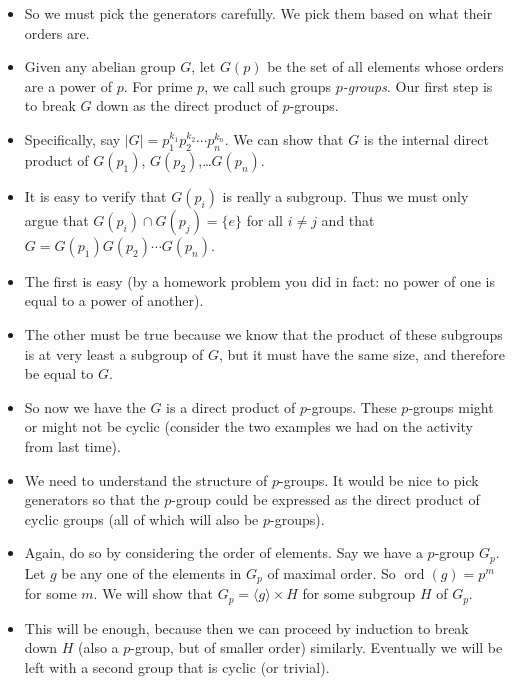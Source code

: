 \documentclass[12pt]{article}
\theoremstyle{plain}
\theoremstyle{definition}
\theoremstyle{remark}
\DeclareMathOperator{\ord}{ord}
\begin{document}
\begin{itemize}
\item So we must pick the generators carefully.  We pick them based on what their orders are.

\item Given any abelian group $G$, let $G(p)$ be the set of all elements whose orders are a power of $p$.  For prime $p$, we call such groups \emph{$p$-groups}.  Our first step is to break $G$ down as the direct product of $p$-groups.

\item Specifically, say $|G| = p_1^{k_1}p_2^{k_2}\cdots p_n^{k_n}$.  We can show that $G$ is the internal direct product of $G(p_1)$, $G(p_2)$,\ldots $G(p_n)$.

\item It is easy to verify that $G(p_i)$ is really a subgroup.  Thus we must only argue that $G(p_i)\cap G(p_j) = \{e\}$ for all $i \ne j$ and that $G = G(p_1)G(p_2)\cdots G(p_n)$.

\item The first is easy (by a homework problem you did in fact: no power of one is equal to a power of another).

\item The other must be true because we know that the product of these subgroups is at very least a subgroup of $G$, but it must have the same size, and therefore be equal to $G$.

\item So now we have the $G$ is a direct product of $p$-groups.  These $p$-groups might or might not be cyclic (consider the two examples we had on the activity from last time).  

\item We need to understand the structure of $p$-groups.  It would be nice to pick generators so that the $p$-group could be expressed as the direct product of cyclic groups (all of which will also be $p$-groups).

\item Again, do so by considering the order of elements.  Say we have a $p$-group $G_p$.  Let $g$ be any one of the elements in $G_p$ of maximal order.  So $\ord(g) = p^m$ for some $m$.  We will show that $G_p = \langle g \rangle \times H$ for some subgroup $H$ of $G_p$.

\item This will be enough, because then we can proceed by induction to break down $H$ (also a $p$-group, but of smaller order) similarly.  Eventually we will be left with a second group that is cyclic (or trivial).



\end{itemize}
\end{document}

